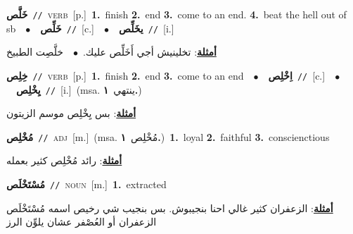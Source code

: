 \documentclass[10pt,a4paper,twoside]{article} %
\begin{document}
\begin{multicols}{2}
{\setlength\topsep{0pt}\textbf{\foreignlanguage{arabic}{خَلَّص}}\ {\color{gray}\texttt{//}\color{black}}\ \textsc{verb}\ [p.]\ \textbf{1.}~finish  \textbf{2.}~end  \textbf{3.}~come to an end.  \textbf{4.}~beat the hell out of sb\ \ $\bullet$\ \ \setlength\topsep{0pt}\textbf{\foreignlanguage{arabic}{خَلِّص}}\ {\color{gray}\texttt{//}\color{black}}\ [c.]\ \ $\bullet$\ \ \setlength\topsep{0pt}\textbf{\foreignlanguage{arabic}{يخَلِّص}}\ {\color{gray}\texttt{//}\color{black}}\ [i.]\  \begin{flushright}\color{gray}\foreignlanguage{arabic}{\textbf{\underline{\foreignlanguage{arabic}{أمثلة}}}: تخلينيش أجي أَخَلِّص عليك.\ $\bullet$\ \  خلَّصِت الطبيخ}\end{flushright}\color{black}} \vspace{2mm}

{\setlength\topsep{0pt}\textbf{\foreignlanguage{arabic}{خِلِص}}\ {\color{gray}\texttt{//}\color{black}}\ \textsc{verb}\ [p.]\ \textbf{1.}~finish  \textbf{2.}~end  \textbf{3.}~come to an end\ \ $\bullet$\ \ \setlength\topsep{0pt}\textbf{\foreignlanguage{arabic}{اِخْلِص}}\ {\color{gray}\texttt{//}\color{black}}\ [c.]\ \ $\bullet$\ \ \setlength\topsep{0pt}\textbf{\foreignlanguage{arabic}{يِخْلِص}}\ {\color{gray}\texttt{//}\color{black}}\ [i.]\ \color{gray}(msa. \foreignlanguage{arabic}{ينتهي}~\foreignlanguage{arabic}{\textbf{١.}})\color{black}\  \begin{flushright}\color{gray}\foreignlanguage{arabic}{\textbf{\underline{\foreignlanguage{arabic}{أمثلة}}}: بس يِخْلِص موسم الزيتون}\end{flushright}\color{black}} \vspace{2mm}

{\setlength\topsep{0pt}\textbf{\foreignlanguage{arabic}{مُخْلِص}}\ {\color{gray}\texttt{//}\color{black}}\ \textsc{adj}\ [m.]\ \color{gray}(msa. \foreignlanguage{arabic}{مُخْلِص}~\foreignlanguage{arabic}{\textbf{١.}})\color{black}\ \textbf{1.}~loyal  \textbf{2.}~faithful  \textbf{3.}~conscienctious\  \begin{flushright}\color{gray}\foreignlanguage{arabic}{\textbf{\underline{\foreignlanguage{arabic}{أمثلة}}}: رائد مُخْلِص كثير بعمله}\end{flushright}\color{black}} \vspace{2mm}

{\setlength\topsep{0pt}\textbf{\foreignlanguage{arabic}{مُسْتَخْلَص}}\ {\color{gray}\texttt{//}\color{black}}\ \textsc{noun}\ [m.]\ \textbf{1.}~extracted\  \begin{flushright}\color{gray}\foreignlanguage{arabic}{\textbf{\underline{\foreignlanguage{arabic}{أمثلة}}}: الزعفران كثير غالي احنا بنجيبوش. بس بنجيب شي رخيص اسمه مُسْتَخْلَص الزعفران أو العُصْفر عشان يلوِّن الرز}\end{flushright}\color{black}} \vspace{2mm}


\end{multicols}
\end{document}
